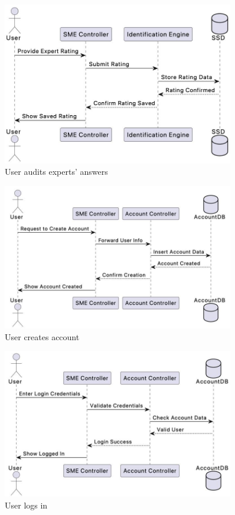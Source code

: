 \documentclass[]{article}
\begin{document}
\begin{figure}[H]
    \centering
    \includegraphics[width=0.9\textwidth]{S3/image (3).jpeg}
	\caption{User audits experts’ answers}
\end{figure}

\begin{figure}[H]
    \centering
    \includegraphics[width=0.9\textwidth]{S3/image (4).jpeg}
	\caption{User creates account}
\end{figure}

\begin{figure}[H]
    \centering
    \includegraphics[width=0.9\textwidth]{S3/image (5).jpeg}
	\caption{User logs in}
\end{figure}
\end{document}
